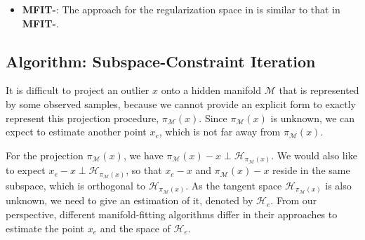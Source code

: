 \documentclass[aos,preprint]{imsart}
\theoremstyle{remark}
\begin{document}
\begin{appendix}
\begin{itemize}
\item{\bf MFIT-}: The approach for the regularization space in \cite{yao2019manifold}  is similar to that in {\bf MFIT-}.

\end{itemize}
\begin{table}[t]
 \end{table}

\subsection{Algorithm: Subspace-Constraint Iteration}
It is difficult to project an outlier ${x}$ onto a hidden manifold $\mathcal M$ that is represented by some observed samples, because we cannot provide an explicit form to exactly represent this projection procedure, $\pi_{\mathcal M}({x})$. Since $\pi_{\mathcal M}({x})$ is unknown, we can expect to estimate another point $x_e$, which is not far away from $\pi_{\mathcal M}({x})$. 

For the projection $\pi_{\mathcal M}({x})$, we have $\pi_{\mathcal M}({x})-{x} \perp {\mathcal H}_{\pi_{\mathcal M}({x})}$. We would also like to expect $x_e-{x}\perp {\mathcal H}_{\pi_{\mathcal M}({x})}$, so that $x_e-{x}$ and $\pi_{\mathcal M}({x})-{x}$ reside in the same subspace, which is orthogonal to ${\mathcal H}_{\pi_{\mathcal M}({x})}$. As the tangent space ${\mathcal H}_{\pi_{\mathcal M}({x})}$ is also unknown, we need to give an estimation of it, denoted by ${\mathcal H}_e$.
From our perspective, different manifold-fitting algorithms differ in their approaches to estimate the point $x_e$ and the space of ${\mathcal H}_e$.


\end{appendix}
\end{document}
